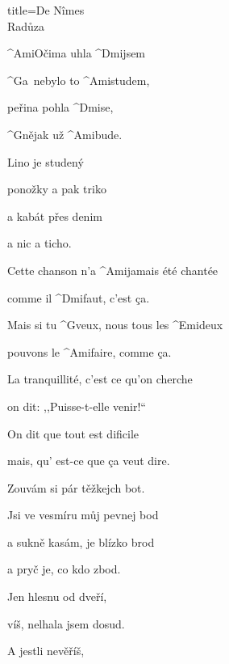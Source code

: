 \begin{song}{title=\predtitle\centering De N\^{i}mes \\\large Radůza  \vspace*{-0.3cm}}  %
\begin{centerjustified}

\begin{varwidth}[t]{0.48\textwidth}\setlength{\parindent}{0.45cm}  %

\sloka
	^{Ami\z }Očima uhla ^{Dmi}jsem

	^{G\z }a~nebylo to ^{\z Ami}studem,

	peřina pohla ^{Dmi}se,~~

	^{G}nějak už ^{\z Ami}bude.

	\phantom{.}

	Lino je studený

	ponožky a pak triko

	a kabát přes denim

	a nic a ticho.

	Cette chanson n’a ^{Ami}jamais été chantée

	comme il ^{Dmi}faut, c’est ça.

	Mais si tu ^{G}veux, nous tous les ^{Emi}deux

	pouvons le ^{Ami}faire, comme ça.

	\phantom{.}

	La tranquillité, c’est ce qu’on cherche

	on dit: ,,Puisse-t-elle venir!{}``

	On dit que tout est dificile

	mais, qu’ est-ce que \c ca veut dire.

	Zouvám si pár těžkejch bot.

	Jsi ve vesmíru můj pevnej bod

	a sukně kasám, je blízko brod

	a pryč je, co kdo zbod.

\end{varwidth}\mezisloupci\begin{varwidth}[t]{0.48\textwidth}\setlength{\parindent}{0.45cm}
\vspace*{0.375cm}  %

\sloka
	Jen hlesnu od dveří,
	
	víš, nelhala jsem dosud.

	A jestli nevěříš,
	

\end{varwidth}
\end{centerjustified}
\end{song}
